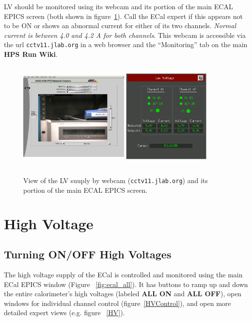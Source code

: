 \documentclass[12pt]{article}
\begin{document}
LV should be monitored using its webcam and its portion of the main ECAL EPICS screen (both shown in figure~\ref{LVCam}). Call the ECal expert if this appears not to be ON or shows an abnormal current for either of its two channels.  {\em Normal current is between 4.0 and 4.2 A for both channels}.  This webcam is accessible via the url \texttt{cctv11.jlab.org} in a web browser and the ``Monitoring'' tab on the main {\bf HPS Run Wiki}.
\begin{figure}[htbp]
\center
\includegraphics[width=0.49\textwidth,height=5.5cm]{pics/LVCam_2014_12_20.png}
\includegraphics[width=0.39\textwidth,height=5.5cm]{pics/lvnovice.png}
\caption{ \label{LVCam} View of the LV suuply by webcam (\texttt{cctv11.jlab.org}) and its portion of the main ECAL EPICS screen.}
\end{figure}

\section{High Voltage}
      \subsection{Turning ON/OFF High Voltages}

      The high voltage supply of the ECal is controlled and monitored using the main ECal
EPICS window (Figure ~\ref{fig:ecal_all}).  It has buttons to ramp up and down the entire 
calorimeter's high voltages (labeled {\bf ALL ON} and {\bf ALL OFF}), open windows for
individual channel control (figure~\ref{HVControl}), and open more detailed expert views 
(e.g. figure ~\ref{HV}).
\end{document}
